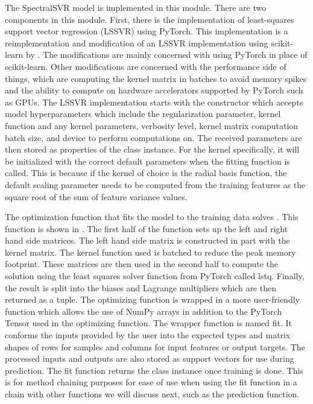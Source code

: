 \noindent The SpectralSVR model is implemented in this module. There are two components in this module. First, there is the implementation of least-squares support vector regression (LSSVR) using PyTorch. This implementation is a reimplementation and modification of an LSSVR implementation using scikit-learn by \textcite{florencioLssvr2020}. The modifications are mainly concerned with using PyTorch in place of scikit-learn. Other modifications are concerned with the performance side of things, which are computing the kernel matrix in batches to avoid memory spikes and the ability to compute on hardware accelerators supported by PyTorch such as GPUs. The LSSVR implementation starts with the constructor which accepts model hyperparameters which include the regularization parameter, kernel function and any kernel parameters, verbosity level, kernel matrix computation batch size, and device to perform computations on. The received parameters are then stored as properties of the class instance. For the kernel specifically, it will be initialized with the correct default parameters when the fitting function is called. This is because if the kernel of choice is the radial basis function, the default scaling parameter needs to be computed from the training features as the square root of the sum of feature variance values.

The optimization function that fits the model to the training data solves . This function is shown in . The first half of the function sets up the left and right hand side matrices. The left hand side matrix is constructed in part with the kernel matrix. The kernel function used is batched to reduce the peak memory footprint. These matrices are then used in the second half to compute the solution using the least squares solver function from PyTorch called lstq. Finally, the result is split into the biases and Lagrange multipliers which are then returned as a tuple. The optimizing function is wrapped in a more user-friendly function which allows the use of NumPy arrays in addition to the PyTorch Tensor used in the optimizing function. The wrapper function is named fit. It conforms the inputs provided by the user into the expected types and matrix shapes of rows for samples and columns for input features or output targets. The processed inputs and outputs are also stored as support vectors for use during prediction. The fit function returns the class instance once training is done. This is for method chaining purposes for ease of use when using the fit function in a chain with other functions we will discuss next, such as the prediction function.

